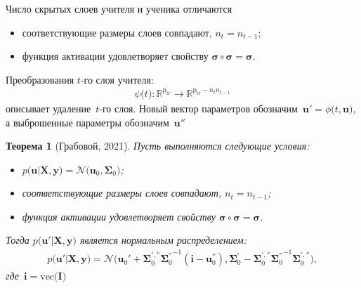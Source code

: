 \documentclass[10pt,pdf,hyperref={unicode}]{beamer}
\newtheorem{rustheorem}{Теорема}
\begin{document}
\begin{frame}{Число скрытых слоев учителя и ученика отличаются}
\begin{itemize}
    \item соответствующие размеры слоев совпадают, $n_t=n_{t-1}$;
    \item функция активации удовлетворяет свойству $\bm{\sigma} \circ \bm{\sigma} = \bm{\sigma}$.
\end{itemize}
Преобразования $t$-го слоя учителя:
\[
\begin{aligned}
\psi\bigr(t\bigr) : \mathbb{R}^{\text{p}_{\text{tr}}} \to \mathbb{R}^{\text{p}_{\text{tr}}-n_tn_{t-1}}
\end{aligned}
\]
описывает удаление~$t$-го слоя. Новый вектор параметров обозначим~$\mathbf{u}' =  \phi\bigr(t, \mathbf{u}\bigr),$ а выброшенные параметры обозначим~$\mathbf{u}''$

\begin{rustheorem}[Грабовой, 2021]
Пусть выполняются следующие условия:
\begin{itemize}
\item $p\bigr(\mathbf{u}|\mathbf{X}, \mathbf{y}\bigr) = \mathcal{N}\bigr(\mathbf{u}_0, \bm{\Sigma}_0\bigr)$;
\item соответствующие размеры слоев совпадают, $n_t=n_{t-1}$;
\item функция активации удовлетворяет свойству $\bm{\sigma} \circ \bm{\sigma} = \bm{\sigma}$.
\end{itemize}
Тогда $p\bigr(\mathbf{u}'|\mathbf{X}, \mathbf{y}\bigr)$ является нормальным распределением:
\[
\begin{aligned}
p\bigr(\mathbf{u}'|\mathbf{X}, \mathbf{y}\bigr) = \mathcal{N}\bigr(\mathbf{u}_{0}'+\bm{\Sigma}_0^{', ''}{\bm{\Sigma}_0^{''}}^{-1}\left(\mathbf{i} - \mathbf{u}_0^{''}\right), \bm{\Sigma}_0^{'}-\bm{\Sigma}_0^{', ''}{\bm{\Sigma}_0^{''}}^{-1}\bm{\Sigma}_0^{', ''}\bigr),
\end{aligned}
\]
где~$\mathbf{i} = \mathrm{vec}\bigr(\mathbf{I}\bigr)$
\end{rustheorem}

\end{frame}
\end{document}
